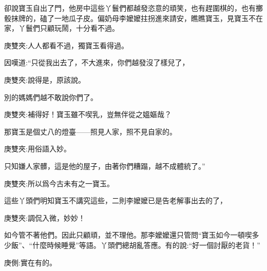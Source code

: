 \begin{parag}
    卻說寶玉自出了門，他房中這些丫鬟們都越發恣意的頑笑，也有趕圍棋的，也有擲骰抹牌的，磕了一地瓜子皮。偏奶母李嬤嬤拄拐進來請安，瞧瞧寶玉，見寶玉不在家，丫鬟們只顧玩鬧，十分看不過。\begin{note}庚雙夾:人人都看不過，獨寶玉看得過。\end{note}因嘆道:“只從我出去了，不大進來，你們越發沒了樣兒了，\begin{note}庚雙夾:說得是，原該說。\end{note}別的媽媽們越不敢說你們了。\begin{note}庚雙夾:補得好！寶玉雖不喫乳，豈無伴從之媼嫗哉？\end{note}那寶玉是個丈八的燈臺——照見人家，照不見自家的。\begin{note}庚雙夾:用俗語入妙。\end{note}只知嫌人家髒，這是他的屋子，由著你們糟蹋，越不成體統了。”\begin{note}庚雙夾:所以爲今古未有之一寶玉。\end{note}這些丫頭們明知寶玉不講究這些，二則李嬤嬤已是告老解事出去的了，\begin{note}庚雙夾:調侃入微，妙妙！\end{note}如今管不著他們。因此只顧頑，並不理他。那李嬤嬤還只管問“寶玉如今一頓喫多少飯”、“什麼時候睡覺”等語。丫頭們總胡亂答應。有的說:“好一個討厭的老貨！”\begin{note}庚側:實在有的。\end{note}
\end{parag}


